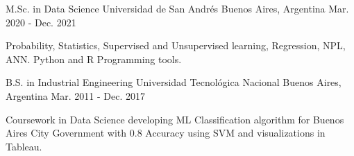 

\begin{cventries}

  \cventry
    {M.Sc. in Data Science} %
    {Universidad de San Andrés} %
    {Buenos Aires, Argentina} %
    {Mar. 2020 - Dec. 2021} %
    {
      \begin{cvitems} %
        \item {Probability, Statistics, Supervised and Unsupervised learning, Regression, NPL, ANN. Python and R Programming tools.}
      \end{cvitems}
    }
    
  \cventry
    {B.S. in Industrial Engineering} %
    {Universidad Tecnológica Nacional} %
    {Buenos Aires, Argentina} %
    {Mar. 2011 - Dec. 2017} %
    {
      \begin{cvitems} %
        \item {Coursework in Data Science developing ML Classification algorithm for Buenos Aires City Government with 0.8 Accuracy using SVM and visualizations in Tableau.}
      \end{cvitems}
    }
\end{cventries}
